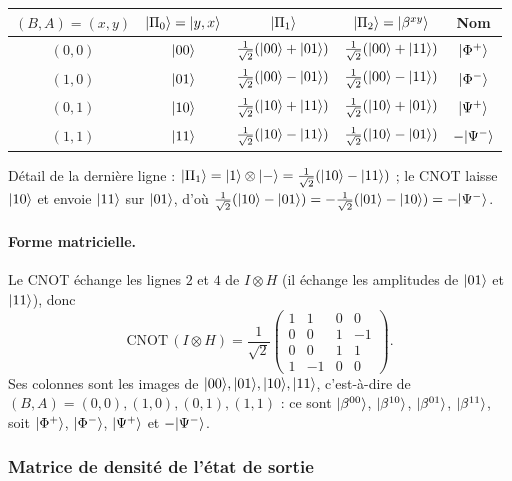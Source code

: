 \begin{center}
\renewcommand{\arraystretch}{1.7}
\begin{tabular}{@{}ccccc@{}}
\toprule
$(B,A)=(x,y)$ & $|\Pi_0\rangle=|y,x\rangle$ & $|\Pi_1\rangle$ & $|\Pi_2\rangle=|\beta^{xy}\rangle$ & Nom \\
\midrule
$(0,0)$ & $|00\rangle$ & $\frac{1}{\sqrt2}(|00\rangle+|01\rangle)$ & $\frac{1}{\sqrt2}(|00\rangle+|11\rangle)$ & $|\Phi^+\rangle$ \\
$(1,0)$ & $|01\rangle$ & $\frac{1}{\sqrt2}(|00\rangle-|01\rangle)$ & $\frac{1}{\sqrt2}(|00\rangle-|11\rangle)$ & $|\Phi^-\rangle$ \\
$(0,1)$ & $|10\rangle$ & $\frac{1}{\sqrt2}(|10\rangle+|11\rangle)$ & $\frac{1}{\sqrt2}(|10\rangle+|01\rangle)$ & $|\Psi^+\rangle$ \\
$(1,1)$ & $|11\rangle$ & $\frac{1}{\sqrt2}(|10\rangle-|11\rangle)$ & $\frac{1}{\sqrt2}(|10\rangle-|01\rangle)$ & $-|\Psi^-\rangle$ \\
\bottomrule
\end{tabular}
\end{center}
Détail de la dernière ligne : $|\Pi_1\rangle=|1\rangle\otimes|-\rangle=\frac{1}{\sqrt2}(|10\rangle-|11\rangle)$ ;
le CNOT laisse $|10\rangle$ et envoie $|11\rangle$ sur $|01\rangle$, d'où
$\frac{1}{\sqrt2}(|10\rangle-|01\rangle)=-\frac{1}{\sqrt2}(|01\rangle-|10\rangle)=-|\Psi^-\rangle$.

\paragraph{Forme matricielle.} Le CNOT échange les lignes $2$ et $4$ de
$I\otimes H$ (il échange les amplitudes de $|01\rangle$ et $|11\rangle$), donc
\[
  \mathrm{CNOT}\,(I\otimes H)=\frac{1}{\sqrt2}\begin{pmatrix}
    1 & 1 & 0 & 0\\ 0 & 0 & 1 & -1\\ 0 & 0 & 1 & 1\\ 1 & -1 & 0 & 0
  \end{pmatrix}.
\]
Ses colonnes sont les images de $|00\rangle,|01\rangle,|10\rangle,|11\rangle$, c'est-à-dire de
$(B,A)=(0,0),(1,0),(0,1),(1,1)$ : ce sont $|\beta^{00}\rangle$, $|\beta^{10}\rangle$,
$|\beta^{01}\rangle$, $|\beta^{11}\rangle$, soit $|\Phi^+\rangle$, $|\Phi^-\rangle$, $|\Psi^+\rangle$
et $-|\Psi^-\rangle$.

\subsubsection{Matrice de densité de l'état de sortie}

